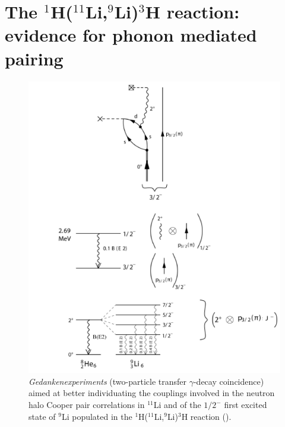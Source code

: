  \section[Evidence for phonon mediated pairing]{The $^1$H($^{11}$Li,$^9$Li)$^3$H reaction: evidence for phonon mediated pairing}\label{C8S1}
    \begin{figure}
    \centerline{\includegraphics*[width=16cm,angle=0]{C8/figsC8/fig8_1_3x}}
    	\caption{\emph{Gedankenexperiments} (two-particle transfer $\gamma$-decay coincidence) aimed at better individuating the couplings involved in the neutron halo Cooper pair correlations in $^{11}$Li and of the $1/2^-$ first excited state of $^9$Li populated in the  
    	 $^1$H($^{11}$Li,$^9$Li)$^3$H  reaction (\cite{Tanihata:08,Barranco:01,Potel:10}).}\label{fig8_1_3}
    \end{figure}
